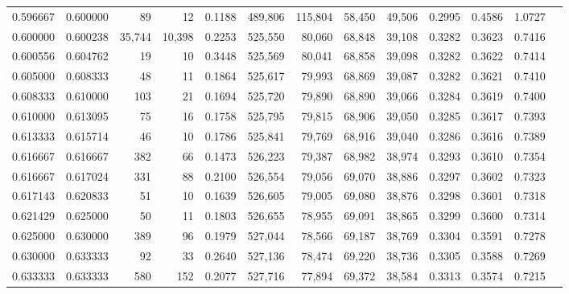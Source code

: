 \begin{tabular}{rrrrrrrrrrrrr}
0.596667 & 0.600000 &     89 &     12 &                                     0.1188 & 489,806 & 115,804 &  58,450 &  49,506 & 0.2995 & 0.4586 & 1.0727 \\
0.600000 & 0.600238 & 35,744 & 10,398 &                                     0.2253 & 525,550 &  80,060 &  68,848 &  39,108 & 0.3282 & 0.3623 & 0.7416 \\
0.600556 & 0.604762 &     19 &     10 &                                     0.3448 & 525,569 &  80,041 &  68,858 &  39,098 & 0.3282 & 0.3622 & 0.7414 \\
0.605000 & 0.608333 &     48 &     11 &                                     0.1864 & 525,617 &  79,993 &  68,869 &  39,087 & 0.3282 & 0.3621 & 0.7410 \\
0.608333 & 0.610000 &    103 &     21 &                                     0.1694 & 525,720 &  79,890 &  68,890 &  39,066 & 0.3284 & 0.3619 & 0.7400 \\
0.610000 & 0.613095 &     75 &     16 &                                     0.1758 & 525,795 &  79,815 &  68,906 &  39,050 & 0.3285 & 0.3617 & 0.7393 \\
0.613333 & 0.615714 &     46 &     10 &                                     0.1786 & 525,841 &  79,769 &  68,916 &  39,040 & 0.3286 & 0.3616 & 0.7389 \\
0.616667 & 0.616667 &    382 &     66 &                                     0.1473 & 526,223 &  79,387 &  68,982 &  38,974 & 0.3293 & 0.3610 & 0.7354 \\
0.616667 & 0.617024 &    331 &     88 &                                     0.2100 & 526,554 &  79,056 &  69,070 &  38,886 & 0.3297 & 0.3602 & 0.7323 \\
0.617143 & 0.620833 &     51 &     10 &                                     0.1639 & 526,605 &  79,005 &  69,080 &  38,876 & 0.3298 & 0.3601 & 0.7318 \\
0.621429 & 0.625000 &     50 &     11 &                                     0.1803 & 526,655 &  78,955 &  69,091 &  38,865 & 0.3299 & 0.3600 & 0.7314 \\
0.625000 & 0.630000 &    389 &     96 &                                     0.1979 & 527,044 &  78,566 &  69,187 &  38,769 & 0.3304 & 0.3591 & 0.7278 \\
0.630000 & 0.633333 &     92 &     33 &                                     0.2640 & 527,136 &  78,474 &  69,220 &  38,736 & 0.3305 & 0.3588 & 0.7269 \\
0.633333 & 0.633333 &    580 &    152 &                                     0.2077 & 527,716 &  77,894 &  69,372 &  38,584 & 0.3313 & 0.3574 & 0.7215 \\

\end{tabular}

